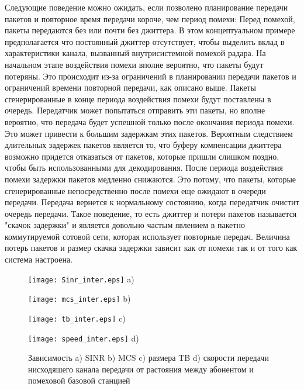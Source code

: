 Следующие поведение можно ожидать, если позволено планирование передачи пакетов и повторное время передачи короче, чем период помехи:
Перед помехой, пакеты передаются без или почти без джиттера. В этом концептуальном  примере предполагается что постоянный джиттер отсутствует, чтобы выделить вклад в характеристики канала, вызванный внутрисистемной помехой радара.
На начальном этапе воздействия помехи вполне вероятно, что пакеты будут потеряны. Это происходит из-за ограничений в планировании передачи пакетов и ограничений времени повторной передачи, как описано выше.
Пакеты сгенерированные в конце периода воздействия помехи будут поставлены в очередь. Передатчик может попытаться отправить эти пакеты, но вполне вероятно, что передача будет успешной только после окончания периода помехи. Это может привести к большим задержкам этих пакетов. Вероятным следствием длительных задержек пакетов является то, что буферу компенсации джиттера возможно придется отказаться от пакетов, которые пришли слишком поздно, чтобы быть использованными для декодирования.
После периода воздействия помехи задержки пакетов медленно снижаются. Это потому, что пакеты, которые сгенерированные непосредственно после помехи еще ожидают в очереди передачи.
Передача вернется к нормальному состоянию, когда передатчик очистит очередь передачи.
Такое поведение, то есть джиттер и потери пакетов называется "скачок задержки" и является довольно частым явлением в пакетно коммутируемой сотовой сети, которая использует повторные передач. Величина потерь пакетов и размер скачка задержки зависит как от помехи так и от того как система настроена.

\begin{figure} [H]
\begin{minipage}[h]{0.47\linewidth}
\center
\texttt{[image: Sinr\_inter.eps]} a) \\
\end{minipage}
\hfill
\begin{minipage}[h]{0.47\linewidth}
\center
\texttt{[image: mcs\_inter.eps]} b) \\
\end{minipage}
\vfill
\begin{minipage}[h]{0.47\linewidth}
\center
\texttt{[image: tb\_inter.eps]} c) \\
\end{minipage}
\hfill
\begin{minipage}[h]{0.47\linewidth}
\center
\texttt{[image: speed\_inter.eps]} d) \\
\end{minipage}
\caption{Зависимость a) SINR b) MCS c) размера TB d) скорости передачи нисходяшего канала передачи от растояния между абонентом и помеховой базовой станцией}
\label{img:inter}
\end{figure}

